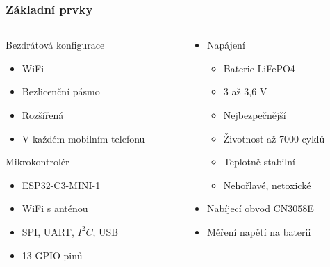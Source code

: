 \documentclass[%
  12pt,       				%
	t,                  %
	aspectratio=1610,   %
	unicode,						%
]{beamer}				    	%
\begin{document}
\begin{frame} 
	\frametitle{Základní prvky}
	
	\begin{columns}[T] 								%
		\begin{column}{0.5\textwidth}		%
			Bezdrátová konfigurace
			\begin{itemize}
				\item WiFi
				\item Bezlicenční pásmo
				\item Rozšířená 
				\item V každém mobilním telefonu
			\end{itemize}
			Mikrokontrolér
			\begin{itemize}
				\item ESP32-C3-MINI-1
				\item WiFi s anténou 
				\item SPI, UART, $I^2C$, USB
				\item 13 GPIO pinů
			\end{itemize}
		\end{column}
		\begin{column}{0.5\textwidth}		%
			\begin{itemize}
				\item Napájení
				\begin{itemize}
					\item Baterie LiFePO4
					\item 3 až 3,6 V
					\item Nejbezpečnější
					\item Životnost až 7000 cyklů 
					\item Teplotně stabilní
					\item Nehořlavé, netoxické
				\end{itemize}
				\item Nabíjecí obvod CN3058E
				\item Měření napětí na baterii 
			\end{itemize}
		\end{column}
	\end{columns}											%
\end{frame}
\end{document}
